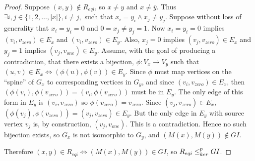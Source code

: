 \begin{proof}
  Suppose $(x, y)\notin R_{eqi}$, so $x\neq y$ and $x\neq\bar{y}$. Thus
  $\exists i,j\in\{1,2,\ldots,|x|\}, i\neq j,$ such that $x_i=y_i\land x_j\neq
  y_j$. Suppose without loss of generality that $x_i=y_i=0$ and $0=x_j\neq
  y_j=1$. Now $x_i=y_i=0$ implies $(v_i, v_{zero})\in E_x$ and $(v_i,
  v_{zero})\in E_y$. Also, $x_j=0$ implies $(v_j, v_{zero})\in E_x$ and $y_j=1$
  implies $(v_j, v_{one})\in E_y$. Assume, with the goal of producing a
  contradiction, that there exists a bijection, $\phi:V_x\to V_y$ such that
  $(u,v)\in E_x\iff(\phi(u),\phi(v))\in E_y$. Since $\phi$ must map vertices
  on the ``spine'' of $G_x$ to corresponding vertices in $G_y$, and since
  $(v_i, v_{zero})\in E_x$, then $(\phi(v_i), \phi(v_{zero}))=(v_i,
  \phi(v_{zero}))$ must be in $E_y$. The only edge of this form in $E_y$ is
  $(v_i, v_{zero})$ so $\phi(v_{zero})=v_{zero}$. Since $(v_j, v_{zero})\in
  E_x$, $(\phi(v_j), \phi(v_{zero}))=(v_j, v_{zero})\in E_y$. But the only edge
  in $E_y$ with source vertex $v_j$ is, by construction, $(v_j, v_{one})$. This
  is a contradiction. Hence no such bijection exists, so $G_x$ is not
  isomorphic to $G_y$, and $(M(x), M(y))\notin GI$.

  Therefore $(x, y)\in R_{eqi} \iff (M(x), M(y))\in GI$, so $R_{eqi}\leq^{p}_{ker} GI$.
\end{proof}
